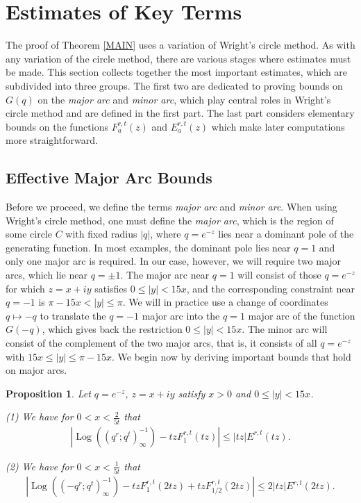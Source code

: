 \documentclass[11pt,reqno]{amsart}
\theoremstyle{definition}
\theoremstyle{plain}
\newtheorem{prop}[theorem]{Proposition}
\theoremstyle{named}
\DeclareMathOperator\Log{Log}
\numberwithin{equation}{section}
\theoremstyle{example}
\def\lp{\left(}
\def\rp{\right)}
\begin{document}
\section{Estimates of Key Terms} \label{Estimates of Key Terms}

The proof of Theorem \ref{MAIN} uses a variation of Wright's circle method. As with any variation of the circle method, there are various stages where estimates must be made. This section collects together the most important estimates, which are subdivided into three groups. The first two are dedicated to proving bounds on $G(q)$ on the {\it major arc} and {\it minor arc}, which play central roles in Wright's circle method and are defined in the first part. The last part considers elementary bounds on the functions $F_a^{r,t}(z)$ and $E_a^{r,t}(z)$ which make later computations more straightforward.

\subsection{Effective Major Arc Bounds}

Before we proceed, we define the terms {\it major arc} and {\it minor arc}. When using Wright's circle method, one must define the {\it major arc}, which is the region of some circle $C$ with fixed radius $|q|$, where $q = e^{-z}$ lies near a dominant pole of the generating function. In most examples, the dominant pole lies near $q=1$ and only one major arc is required. In our case, however, we will require two major arcs, which lie near $q = \pm 1$. The major arc near $q=1$ will consist of those $q = e^{-z}$ for which $z = x + iy$ satisfies $0 \leq |y| < 15x$, and the corresponding constraint near $q = -1$ is $\pi - 15x < |y| \leq \pi$. We will in practice use a change of coordinates $q \mapsto -q$ to translate the $q = -1$ major arc into the $q=1$ major arc of the function $G(-q)$, which gives back the restriction $0 \leq |y| < 15x$. The minor arc will consist of the complement of the two major arcs, that is, it consists of all $q = e^{-z}$ with $15x \leq |y| \leq \pi - 15x$. We begin now by deriving important bounds that hold on major arcs.

\begin{prop} \label{Major Arc Bound}
Let $q = e^{-z}$, $z = x + iy$ satisfy $x > 0$ and $0 \leq |y| < 15x$.

\noindent \textnormal{(1)} We have for $0 < x < \frac{2}{5t}$ that
\begin{align*}
    \left| \Log\lp\lp q^r; q^t \rp_\infty^{-1}\rp - tz F_1^{r,t}(tz) \right| \leq |tz| E^{r,t}(tz).
\end{align*}

\noindent \textnormal{(2)} We have for $0 < x < \frac{1}{5t}$ that
\begin{align*}
    \left| \Log\lp\lp -q^r; q^t \rp_\infty^{-1}\rp - tz F_1^{r,t}(2tz) + tz F_{1/2}^{r,t}(2tz) \right| \leq 2 |tz| E^{r,t}(2tz).
\end{align*}
\end{prop}
\end{document}
